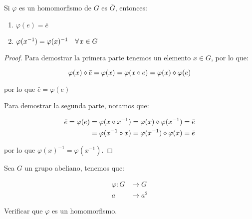         \begin{lema}
            Si $\varphi$ es un homomorfismo de $G$ es $\bar{G}$, entonces:

            \begin{enumerate}
                \item $\varphi(e) = \bar{e}$
                \item $\varphi(x^{-1}) = \varphi(x)^{-1} \quad \forall \mkern2mu x \in G$
            \end{enumerate}
        \end{lema}

        \begin{proof}
            Para demostrar la primera parte tenemos un elemento $x \in G$, por lo que:

            \begin{equation*}
                \varphi(x) \diamond \bar{e} = \varphi(x) = \varphi(x \circ e) = \varphi(x) \diamond \varphi(e)
            \end{equation*}

            por lo que $\bar{e} = \varphi(e)$

            Para demostrar la segunda parte, notamos que:

            \begin{align*}
                \bar{e} = \varphi(e) &= \varphi(x \circ x^{-1}) = \varphi(x) \diamond \varphi(x^{-1}) = \bar{e} \\
                &= \varphi(x^{-1} \circ x) = \varphi(x^{-1}) \diamond \varphi(x) = \bar{e}
            \end{align*}

            por lo que $\varphi(x)^{-1} = \varphi(x^{-1})$.
        \end{proof}


        \begin{ejercicio}
            Sea $G$ un grupo abeliano, tenemos que:

            \begin{align*}
                \varphi \colon G &\to G \\
                a &\to a^2
            \end{align*}

            Verificar que $\varphi$ es un homomorfismo.
        \end{ejercicio}

